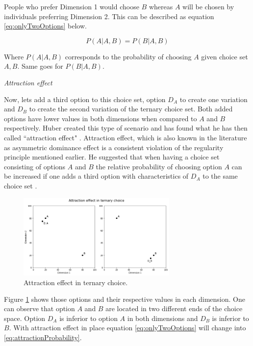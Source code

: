 \documentclass[a4paper,12pt]{article}
\newcommand{\citeyearonly}[1]{\citeyearpar{#1}}
\begin{document}
People who prefer Dimension 1 would choose $B$ whereas $A$ will be chosen by individuals preferring Dimension 2. This can be described as equation \ref{eq:onlyTwoOptions} below.

\begin{equation}\label{eq:onlyTwoOptions}
    P(A|A,B) = P(B|A,B)
\end{equation}

Where $P(A|A,B)$ corresponds to the probability of choosing $A$ given choice set $A,B$. Same goes for $P(B|A,B)$.

\textit{Attraction effect}

Now, lets add a third option to this choice set, option $D_A$ to create one variation and $D_B$ to create the second variation of the ternary choice set. Both added options have lower values in both dimensions when compared to $A$ and $B$ respectively. Huber created this type of scenario and has found what he has then called ``attraction effect" \citeyearonly{huberEtAl82}. Attraction effect, which is also known in the literature as asymmetric dominance effect is a consistent violation of the regularity principle mentioned earlier. He suggested that when having a choice set consisting of options $A$ and $B$ the relative probability of choosing option $A$ can be increased if one adds a third option with characteristics of $D_A$ to the same choice set \citeyearonly{huberEtAl82}.  

\begin{figure}[h]
    \centering
    \includegraphics[width=0.7\textwidth]{staticFiles/attractionEffect.png}
    \caption{Attraction effect in ternary choice.} %
    \label{fig:attractionEffect} %

\end{figure}

Figure \ref{fig:attractionEffect} shows those options and their respective values in each dimension. One can observe that option $A$ and $B$ are located in two different ends of the choice space. Option $D_A$ is inferior to option $A$ in both dimensions and $D_B$ is inferior to $B$. With attraction effect in place equation  \ref{eq:onlyTwoOptions} will change into \ref{eq:attractionProbability}.
\end{document}
